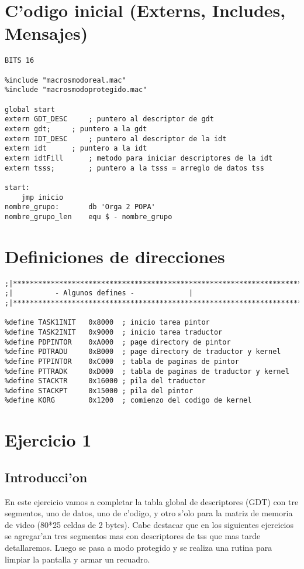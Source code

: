 \documentclass[11pt]{article}
\begin{document}
\newpage

\section{ C'odigo inicial (Externs, Includes, Mensajes) }
\begin{lstlisting}[frame=single]
BITS 16

%include "macrosmodoreal.mac"
%include "macrosmodoprotegido.mac"

global start
extern GDT_DESC		; puntero al descriptor de gdt
extern gdt;		; puntero a la gdt
extern IDT_DESC		; puntero al descriptor de la idt
extern idt		; puntero a la idt
extern idtFill		; metodo para iniciar descriptores de la idt
extern tsss;		; puntero a la tsss = arreglo de datos tss 

start:
	jmp	inicio	
nombre_grupo:		db 'Orga 2 POPA'
nombre_grupo_len	equ $ - nombre_grupo
\end{lstlisting}

\section{Definiciones de direcciones}
\begin{lstlisting}[frame=single]
;|**********************************************************************|
;|			- Algunos defines -				|
;|**********************************************************************|

%define TASK1INIT	0x8000	; inicio tarea pintor
%define TASK2INIT	0x9000	; inicio tarea traductor
%define PDPINTOR	0xA000	; page directory de pintor
%define PDTRADU		0xB000	; page directory de traductor y kernel
%define PTPINTOR	0xC000	; tabla de paginas de pintor
%define PTTRADK		0xD000	; tabla de paginas de traductor y kernel
%define STACKTR		0x16000	; pila del traductor
%define STACKPT		0x15000	; pila del pintor 
%define KORG		0x1200	; comienzo del codigo de kernel
\end{lstlisting}

\newpage

\section{Ejercicio 1}
\subsection{Introducci'on} En este ejercicio vamos a completar la tabla global de descriptores (GDT) con tre segmentos, uno de datos, uno de c'odigo, y otro s'olo para la matriz de memoria de video (80*25 celdas de 2 bytes). Cabe destacar que en los siguientes ejercicios se agregar'an tres segmentos mas con descriptores de tss que mas tarde detallaremos. Luego se pasa a modo protegido y se realiza una rutina para limpiar la pantalla y armar un recuadro.
\end{document}
